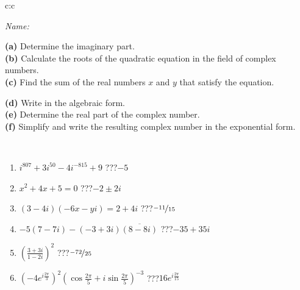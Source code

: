\documentclass[10pt]{report}
\begin{document}
\begin{tabular}{c:c}
\begin{minipage}[c][104.5mm][t]{0.5\linewidth}
\begin{center}
\textit{Name:}\phantom{xxxxxxxxxxxxxxxxxxxxxxxxxxxxxxxxxxxxxxxxxxxxxxxxxxxxxxxxxxxxxxxxx}\\[5mm]
\begin{minipage}{0.95\linewidth}
\begin{center}
{\small \begin{minipage}{0.44\textwidth} \raggedright
\textbf{(a)} Determine the imaginary part. \\[1mm]
\textbf{(b)} Calculate the roots of the quadratic equation in the field of complex numbers. \\[1mm]
\textbf{(c)} Find the sum of the real numbers \(x\) and \(y\) that satisfy the equation. \end{minipage} \begin{minipage}{0.54\textwidth}
\textbf{(d)} Write in the algebraic form. \\[1mm]
\textbf{(e)} Determine the real part of the complex number. \\[1mm]
\textbf{(f)} Simplify and write the resulting complex number in the exponential form.
\end{minipage}
} \vspace{3mm}
\end{center}
\end{minipage}
\\[1mm]
\begin{minipage}{0.79\linewidth}
\begin{center}
\begin{varwidth}{\linewidth}
\setlength{\itemsep}{0pt}
\begin{enumerate}
\large
\item $i^{807}+3i^{50}-4i^{-815}+9$\quad \dotfill\; ???\;\dotfill \quad $-5$
\item $x^2+4x+5=0$\quad \dotfill\; ???\;\dotfill \quad $-2 \pm{}2i$
\item $(3-4i)(-6x-yi)=2+4i$\quad \dotfill\; ???\;\dotfill \quad $\nicefrac{-11}{15}$
\item $-5(7-7i)-(-3+3i)\overline{(8-8i)}$\quad \dotfill\; ???\;\dotfill \quad $-35+35i$
\item $\left(\frac{3+3i}{1-2i}\right)^2$\quad \dotfill\; ???\;\dotfill \quad $\nicefrac{-72}{25}$
\item $\left(-4e^{i\frac{2\pi}{3}}\right)^{2}\left(\cos{\frac{2\pi}{5}}+i\sin{\frac{2\pi}{5}}\right)^{-3}$\quad \dotfill\; ???\;\dotfill \quad $16e^{i\frac{2\pi}{15}}$
\end{enumerate}
\end{varwidth}
\end{center}

\end{minipage}
\end{center}
\end{minipage}
\end{tabular}
\end{document}
